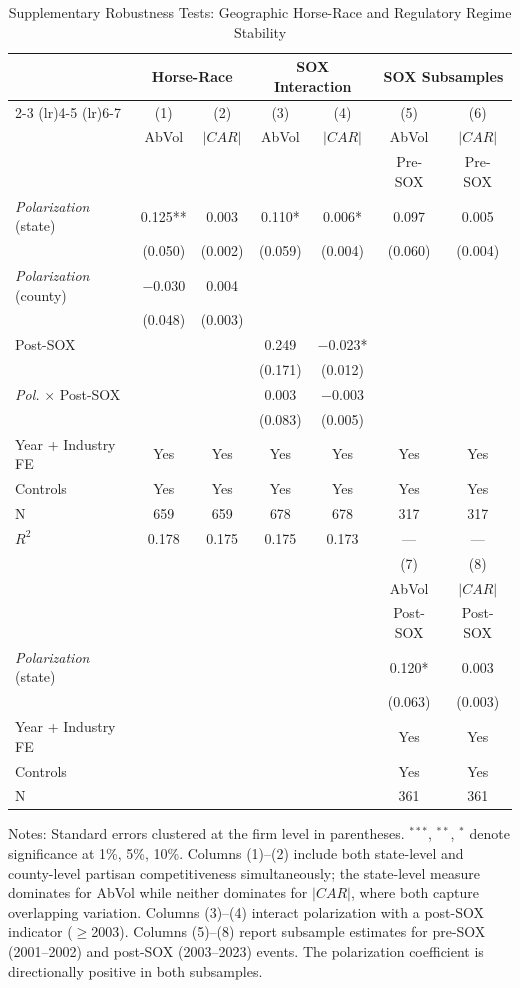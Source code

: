 \begin{table}[htbp]
\centering
\caption{Supplementary Robustness Tests: Geographic Horse-Race and Regulatory Regime Stability}
\label{tab:supplementary}
\small
\begin{tabular}{lcccccc}
\toprule
 & \multicolumn{2}{c}{Horse-Race} & \multicolumn{2}{c}{SOX Interaction} & \multicolumn{2}{c}{SOX Subsamples} \\
\cmidrule(lr){2-3} \cmidrule(lr){4-5} \cmidrule(lr){6-7}
 & (1) & (2) & (3) & (4) & (5) & (6) \\
 & AbVol & $|CAR|$ & AbVol & $|CAR|$ & AbVol & $|CAR|$ \\
 &       &         &       &         & Pre-SOX & Pre-SOX \\
\midrule
\textit{Polarization} (state) & 0.125** & 0.003 & 0.110* & 0.006* & 0.097 & 0.005 \\
 & (0.050) & (0.002) & (0.059) & (0.004) & (0.060) & (0.004) \\
\textit{Polarization} (county) & $-$0.030 & 0.004 &  &  &  &  \\
 & (0.048) & (0.003) &  &  &  &  \\
Post-SOX &  &  & 0.249 & $-$0.023* &  &  \\
 &  &  & (0.171) & (0.012) &  &  \\
\textit{Pol.} $\times$ Post-SOX &  &  & 0.003 & $-$0.003 &  &  \\
 &  &  & (0.083) & (0.005) &  &  \\
\midrule
Year + Industry FE & Yes & Yes & Yes & Yes & Yes & Yes \\
Controls & Yes & Yes & Yes & Yes & Yes & Yes \\
N & 659 & 659 & 678 & 678 & 317 & 317 \\
$R^2$ & 0.178 & 0.175 & 0.175 & 0.173 & --- & --- \\
\midrule
 & & & & & (7) & (8) \\
 & & & & & AbVol & $|CAR|$ \\
 & & & & & Post-SOX & Post-SOX \\
\midrule
\textit{Polarization} (state) & & & & & 0.120* & 0.003 \\
 & & & & & (0.063) & (0.003) \\
\midrule
Year + Industry FE & & & & & Yes & Yes \\
Controls & & & & & Yes & Yes \\
N & & & & & 361 & 361 \\
\bottomrule
\end{tabular}
\begin{flushleft}
\footnotesize Notes: Standard errors clustered at the firm level in parentheses.
$^{***}$, $^{**}$, $^{*}$ denote significance at 1\%, 5\%, 10\%.
Columns (1)--(2) include both state-level and county-level partisan competitiveness
simultaneously; the state-level measure dominates for AbVol while neither dominates
for $|CAR|$, where both capture overlapping variation.
Columns (3)--(4) interact polarization with a post-SOX indicator ($\geq$2003).
Columns (5)--(8) report subsample estimates for pre-SOX (2001--2002) and post-SOX
(2003--2023) events. The polarization coefficient is directionally positive in both subsamples.
\end{flushleft}
\end{table}
